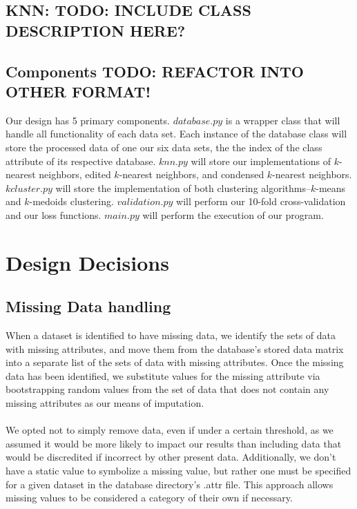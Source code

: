 \documentclass{article}
\begin{document}
\subsection*{KNN: TODO: INCLUDE CLASS DESCRIPTION HERE?}

\subsection*{Components TODO: REFACTOR INTO OTHER FORMAT!}
\quad \quad Our design has 5 primary components. $database.py$ is a wrapper class that will handle all functionality of each data set. Each instance of the database class will store the processed data of one our six data sets, the the index of the class attribute of its respective database. $knn.py$ will store our implementations of $k$-nearest neighbors, edited $k$-nearest neighbors, and condensed $k$-nearest neighbors. $kcluster.py$ will store the implementation of both clustering algorithms--$k$-means and $k$-medoids clustering. $validation.py$ will perform our 10-fold cross-validation and our loss functions. $main.py$ will perform the execution of our program. 

\section{Design Decisions}

\subsection*{Missing Data handling}
\quad \quad When a dataset is identified to have missing data, we identify the sets of data with missing attributes, and move them from the database’s stored data matrix into a separate list of the sets of data with missing attributes. Once the missing data has been identified, we substitute values for the missing attribute via bootstrapping random values from the set of data that does not contain any missing attributes as our means of imputation. \\ \\
\quad \quad We opted not to simply remove data, even if under a certain threshold, as we assumed it would be more likely to impact our results than including data that would be discredited if incorrect by other present data. 
Additionally, we don’t have a static value to symbolize a missing value, but rather one must be specified for a given dataset in the database directory’s .attr file. This approach allows missing values to be considered a category of their own if necessary.
\end{document}

